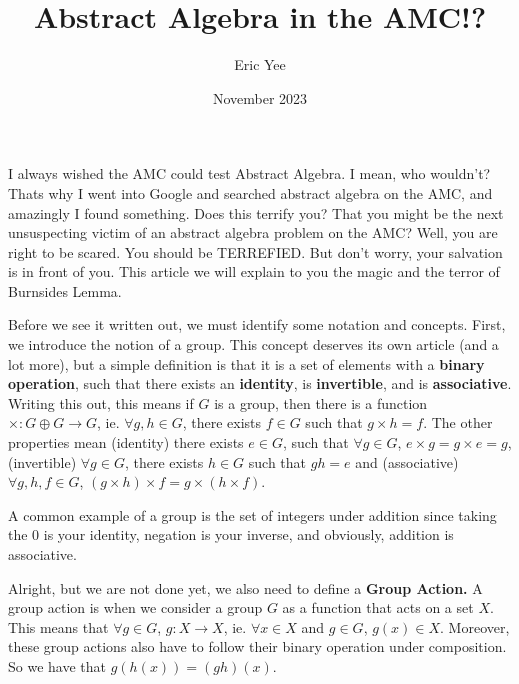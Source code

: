 \documentclass{article}
\title{Abstract Algebra in the AMC!?}
\author{Eric Yee}
\date{November 2023}
\begin{document}
\maketitle

I always wished the AMC could test Abstract Algebra. I mean, who wouldn't? Thats why I went into Google and searched abstract algebra on the AMC, and amazingly I found something. Does this terrify you? That you might be the next unsuspecting victim of an abstract algebra problem on the AMC? Well, you are right to be scared. You should be TERREFIED. But don't worry, your salvation is in front of you. This article we will explain to you the magic and the terror of Burnsides Lemma.

Before we see it written out, we must identify some notation and concepts. First, we introduce the notion of a group. This concept deserves its own article (and a lot more), but a simple definition is that it is a set of elements with a \textbf{binary operation}, such that there exists an \textbf{identity}, is \textbf{invertible}, and is \textbf{associative}. Writing this out, this means if $G$ is a group, then there is a function $\times: G\oplus G \rightarrow G$, ie. $\forall g,h\in G$, there exists $f\in G$ such that $g\times h = f$. The other properties mean (identity) there exists $e\in G$, such that $\forall g\in G$, $e\times g=g\times e = g$, (invertible) $\forall g\in G$, there exists $h\in G$ such that $gh=e$ and (associative) $\forall g,h,f\in G$, $(g\times h)\times f =g\times (h\times f)$.

A common example of a group is the set of integers under addition since taking the $0$ is your identity, negation is your inverse, and obviously, addition is associative.

Alright, but we are not done yet, we also need to define a \textbf{Group Action.} A group action is when we consider a group $G$ as a function that acts on a set $X$. This means that $\forall g\in G$, $g: X\rightarrow X$, ie. $\forall x\in X$ and $g\in G$, $g(x)\in X$. Moreover, these group actions also have to follow their binary operation under composition. So we have that $g(h(x)) = (gh)(x)$. 
\end{document}
